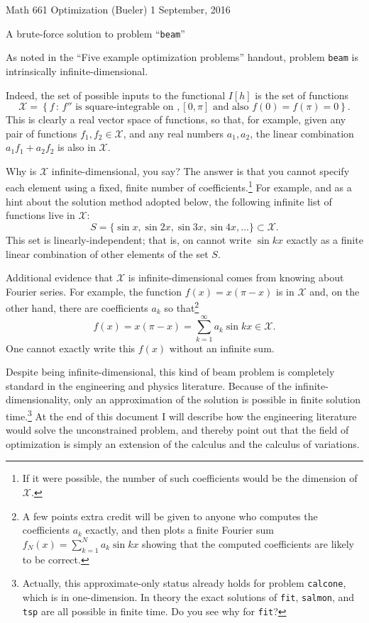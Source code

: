 \documentclass[11pt]{amsart}
\begin{document}
\scriptsize \noindent Math 661 Optimization (Bueler) \hfill 1 September, 2016
\normalsize

\medskip\bigskip
\Large
\centerline{A brute-force solution to problem ``\texttt{beam}''}

\bigskip\medskip
\normalsize

\thispagestyle{empty}

As noted in the ``Five example optimization problems'' handout, problem \texttt{beam} is intrinsically infinite-dimensional.

Indeed, the set of possible inputs to the functional $I[h]$ is the set of functions
    $$\mathcal{X} = \left\{f \,:\, f'' \text{ is square-integrable on }, [0,\pi] \text{ and also } f(0)=f(\pi)=0\right\}.$$
This is clearly a real vector space of functions, so that, for example, given any pair of functions $f_1,f_2 \in \mathcal{X}$, and any real numbers $a_1,a_2$, the linear combination $a_1 f_1 + a_2 f_2$ is also in $\mathcal{X}$.

Why is $\mathcal{X}$ infinite-dimensional, you say?  The answer is that you cannot specify each element using a fixed, finite number of coefficients.\footnote{If it were possible, the number of such coefficients would be the dimension of $\mathcal{X}$.}  For example, and as a hint about the solution method adopted below, the following infinite list of functions live in $\mathcal{X}$:
    $$S = \{\sin x, \sin 2 x, \sin 3 x, \sin 4 x, \dots\} \subset \mathcal{X}.$$
This set is linearly-independent; that is, on cannot write $\sin k x$ exactly as a finite linear combination of other elements of the set $S$.

Additional evidence that $\mathcal{X}$ is infinite-dimensional comes from knowing about Fourier series.  For example, the function $f(x) = x (\pi-x)$ is in $\mathcal{X}$ and, on the other hand, there are coefficients $a_k$ so that\footnote{A few points extra credit will be given to anyone who computes the coefficients $a_k$ exactly, and then plots a finite Fourier sum $f_N(x) = \sum_{k=1}^N a_k \sin k x$ showing that the computed coefficients are likely to be correct.}
    $$f(x) = x (\pi-x) = \sum_{k=1}^\infty a_k \sin k x \in \mathcal{X}.$$
One cannot exactly write this $f(x)$ without an infinite sum.

Despite being infinite-dimensional, this kind of beam problem is completely standard in the engineering and physics literature.  Because of the infinite-dimensionality, only an approximation of the solution is possible in finite solution time.\footnote{Actually, this approximate-only status already holds for problem \texttt{calcone}, which is in one-dimension.  In theory the exact solutions of \texttt{fit}, \texttt{salmon}, and \texttt{tsp} are all possible in finite time.  Do you see why for \texttt{fit}?}  At the end of this document I will describe how the engineering literature would solve the unconstrained problem, and thereby point out that the field of optimization is simply an extension of the calculus and the calculus of variations.
\end{document}
